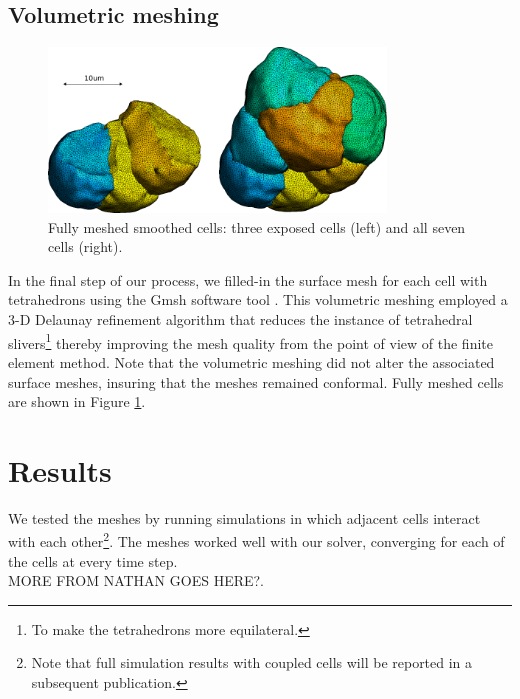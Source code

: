 \documentclass[a4paper,10pt]{article}
\begin{document}
\subsection{Volumetric meshing}

\begin{figure}[H]
\begin{center}
\includegraphics[width=0.8\textwidth]{images/smooth.pdf}
\end{center}
\caption{Fully meshed smoothed cells: three exposed cells (left) and all seven cells (right).}
\label{fig:smooth}
\end{figure}

In the final step of our process, we filled-in the surface mesh for each cell with tetrahedrons using the Gmsh software tool \cite{NME:NME2579}. This volumetric meshing employed a 3-D Delaunay refinement algorithm that reduces the instance of tetrahedral slivers\footnote{To make the tetrahedrons more equilateral.} thereby improving the mesh quality from the point of view of the finite element method. Note that the volumetric meshing did not alter the associated surface meshes, insuring that the meshes remained conformal. Fully meshed cells are shown in Figure \ref{fig:smooth}.\\

\section{Results}

We tested the meshes by running simulations in which adjacent cells interact with each other\footnote{Note that full simulation results with coupled cells will be reported in a subsequent publication.}. The meshes worked well with our solver, converging for each of the cells at every time step. \\

MORE FROM NATHAN GOES HERE?.\\
\end{document}
